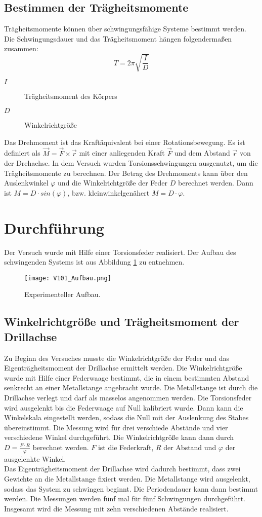 \subsection{Bestimmen der Trägheitsmomente}
Trägheitsmomente können über schwingungsfähige Systeme bestimmt werden. Die Schwingungsdauer und das Trägheitsmoment hängen folgendermaßen zusammen:
\begin{equation}
  T = 2\pi \sqrt{\frac{I}{D}}
\end{equation}
\begin{description}
  \item[$I$]Trägheitsmoment des Körpers
  \item[$D$]Winkelrichtgröße
\end{description}
Das Drehmoment ist das Kraftäquivalent bei einer Rotationsbewegung. Es ist definiert als $\vec{M} = \vec{F} \times \vec{r}$ mit einer anliegenden Kraft $\vec{F}$ und dem Abstand $\vec{r}$ von der Drehachse.
In dem Versuch wurden Torsionsschwingungen ausgenutzt, um die Trägheitsmomente zu berechnen. Der Betrag des Drehmoments kann über den Auslenkwinkel $\varphi$ und die Winkelrichtgröße der Feder $D$ berechnet werden. Dann ist $M = D\cdot sin(\varphi)$, bzw. kleinwinkelgenähert $M = D\cdot\varphi$.
\section{Durchführung}
Der Versuch wurde mit Hilfe einer Torsionsfeder realisiert. Der Aufbau des schwingenden Systems ist aus Abbildung \ref{fig:Aufbau} zu entnehmen.
\begin{figure}
  \centering
  \texttt{[image: V101\_Aufbau.png]}
  \caption{Experimenteller Aufbau.\cite{anleitung01}}
  \label{fig:Aufbau}
\end{figure}
\FloatBarrier
\subsection{Winkelrichtgröße und Trägheitsmoment der Drillachse}
Zu Beginn des Versuches musste die Winkelrichtgröße der Feder und das Eigenträgheitsmoment der Drillachse ermittelt werden. Die Winkelrichtgröße wurde mit Hilfe einer Federwaage bestimmt,
die in einem bestimmten Abstand senkrecht an einer Metallstange angebracht wurde. Die Metallstange ist durch die Drillachse verlegt und darf als masselos angenommen werden. Die Torsionsfeder
wird ausgelenkt bis die Federwaage auf Null kalibriert wurde. Dann kann die Winkelskala eingestellt werden, sodass die Null mit der Auslenkung des Stabes übereinstimmt. Die Messung wird für
drei verschiede Abstände und vier verschiedene Winkel durchgeführt. Die Winkelrichtgröße kann dann durch $D = \frac{F\cdot R}{\varphi}$ berechnet werden. $F$ ist die Federkraft, $R$ der
Abstand und $\varphi$ der ausgelenkte Winkel.\\
Das Eigenträgheitsmoment der Drillachse wird dadurch bestimmt, dass zwei Gewichte an die Metallstange fixiert werden. Die Metallstange wird ausgelenkt, sodass das System zu schwingen beginnt.
Die Periodendauer kann dann bestimmt werden. Die Messungen werden fünf mal für fünf Schwingungen durchgeführt. Insgesamt wird die Messung mit zehn verschiedenen Abstände realisiert.
